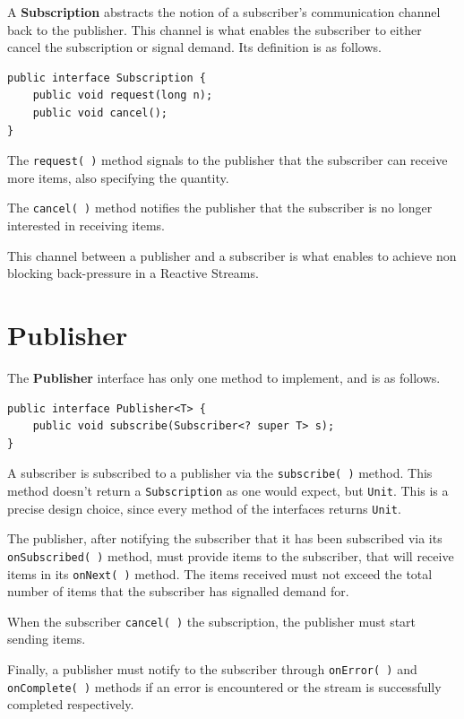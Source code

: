 A \textbf{Subscription} abstracts the notion of a subscriber's
communication channel back to the publisher. This channel is what
enables the subscriber to either cancel the subscription or signal
demand. Its definition is as follows.

\begin{verbatim}
public interface Subscription {
    public void request(long n);
    public void cancel();
}
\end{verbatim}

The \texttt{request(\ )} method signals to the publisher that the
subscriber can receive more items, also specifying the quantity.

The \texttt{cancel(\ )} method notifies the publisher that the
subscriber is no longer interested in receiving items.

This channel between a publisher and a subscriber is what enables to
achieve non blocking back-pressure in a Reactive Streams.

\section{Publisher}\label{publisher}

The \textbf{Publisher} interface has only one method to implement, and
is as follows.

\begin{verbatim}
public interface Publisher<T> {
    public void subscribe(Subscriber<? super T> s);
}
\end{verbatim}

A subscriber is subscribed to a publisher via the \texttt{subscribe(\ )}
method. This method doesn't return a \texttt{Subscription} as one would
expect, but \texttt{Unit}. This is a precise design choice, since every
method of the interfaces returns \texttt{Unit}.

The publisher, after notifying the subscriber that it has been
subscribed via its \texttt{onSubscribed(\ )} method, must provide items
to the subscriber, that will receive items in its \texttt{onNext(\ )}
method. The items received must not exceed the total number of items
that the subscriber has signalled demand for.

When the subscriber \texttt{cancel(\ )} the subscription, the publisher
must start sending items.

Finally, a publisher must notify to the subscriber through
\texttt{onError(\ )} and \texttt{onComplete(\ )} methods if an error is
encountered or the stream is successfully completed respectively.

